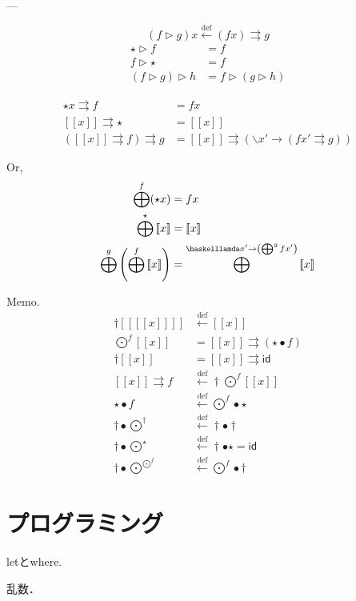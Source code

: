 \documentclass[twocolumn]{jsbook}
\newcommand{\bind}{\rightrightarrows} %
\newcommand{\comp}{\bullet} %
\newcommand{\defeq}{\xleftarrow{\text{def}}}
\newcommand{\haskelllambda}{\backslash}
\newcommand{\mapfunc}{\bigodot} %
\newcommand{\monadfunc}{\bigoplus}
\newcommand{\monadjoin}{\dag}
\newcommand{\unit}{\star} %
\newcommand{\monad}[1]{\left[\!\left[#1\right]\!\right]}
\newcommand{\specialkeyword}[1]{\textsf{#1}}
\newcommand{\identity}{\specialkeyword{id}}
\begin{document}
---

$$(f\triangleright g)x\defeq(fx)\bind g$$
\begin{align}
\unit\triangleright f&=f\\
f\triangleright\unit&=f\\
(f\triangleright g)\triangleright h&=f\triangleright(g\triangleright h)
\end{align}

\begin{align}
\unit x\bind f&=fx\\
\monad{x}\bind\unit&=\monad{x}\\
(\monad{x}\bind f)\bind g&=\monad{x}\bind(\haskelllambda x'\rightarrow(fx'\bind g))
\end{align}

Or,
\begin{align}
\monadfunc^f(\unit x)&=fx\\
\monadfunc^\unit\monad{x}&=\monad{x}\\
\monadfunc^g\left(\monadfunc^f\monad{x}\right)&=\monadfunc^{\haskelllamda x'\rightarrow\left(\monadfunc^gfx'\right)}\monad{x}
\end{align}

Memo.
\begin{align*}
\monadjoin\monad{\monad{x}}&\defeq\monad{x}\\
\mapfunc^f\monad{x}&=\monad{x}\bind(\unit\comp f)\\
\monadjoin\monad{x}&=\monad{x}\bind\identity\\
\monad{x}\bind f&\defeq\monadjoin\mapfunc^f\monad{x}\\
\unit\comp f&\defeq\mapfunc^f\comp\unit\\
\monadjoin\comp\mapfunc^\monadjoin&\defeq\monadjoin\comp\monadjoin\\
\monadjoin\comp\mapfunc^\unit&\defeq\monadjoin\comp\unit=\identity\\
\monadjoin\comp\mapfunc^{\mapfunc^f}&\defeq\mapfunc^f\comp\monadjoin
\end{align*}

\chapter{プログラミング}

letとwhere.

乱数．
\end{document}
